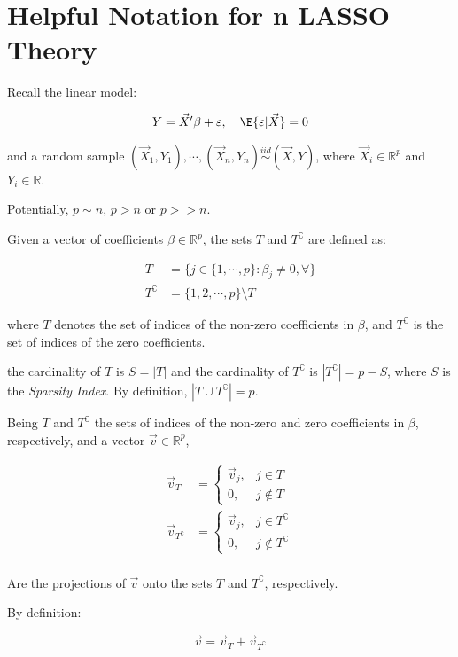 \section{Helpful Notation for n LASSO Theory}
\label{sec:notation-help-lasso}

Recall the linear model:

\begin{align*}
Y = \Vec{X}'\beta + \varepsilon, 
    \quad \E{\varepsilon|\Vec{X}} = 0
\end{align*}

and a random sample $(\Vec{X}_1, Y_1), \cdots, (\Vec{X}_n, Y_n) \overset{iid}{\sim} (\Vec{X}, Y)$, where $\Vec{X}_i \in \mathbb{R}^p$ and $Y_i \in \mathbb{R}$.

Potentially, $p \sim n$, $p > n$ or $p >> n$.

\begin{Def}
Given a vector of  coefficients $\beta \in \mathbb{R}^p$, the sets $T$ and $T^{\complement}$ are defined as:

\begin{align*}
T &= \lbrace
j \in \{1, \cdots, p \} : \beta_j \neq 0, \forall 
\rbrace  \\
T^{\complement} &= \{1, 2, \cdots, p\} \setminus T
\end{align*}

where $T$ denotes the set of indices of the non-zero coefficients in $\beta$, and $T^{\complement}$ is the set of indices of the zero coefficients.

the cardinality of $T$ is $S = |T|$ and the cardinality of $T^{\complement}$ is $|T^{\complement}| = p - S$, where $S$ is the \emph{Sparsity Index}. By definition, $|T \cup T^{\complement}| = p$.
\end{Def}

\begin{Def}
Being $T$ and $T^{\complement}$ the sets of indices of the non-zero and zero coefficients in $\beta$, respectively, and a vector $\Vec{v} \in \mathbb{R}^p$, 

\begin{align*}
    \Vec{v}_T &= \begin{cases}
        \Vec{v}_j, &  j \in T \\
        0, &  j \notin T
    \end{cases}\\
    \Vec{v}_{T^{\complement}} &= \begin{cases}
        \Vec{v}_j, &  j \in T^{\complement}\\
        0, &  j \notin T^{\complement}
    \end{cases}\\
\end{align*}

Are the projections of $\Vec{v}$ onto the sets $T$ and $T^{\complement}$, respectively.

By definition:

\[
\Vec{v} = \Vec{v}_T + \Vec{v}_{T^{\complement}}
\]
\end{Def}

